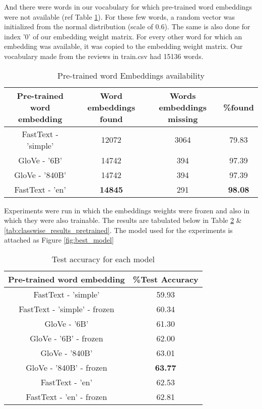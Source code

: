 \documentclass{article}
\begin{document}
\noindent 
And there were words in our vocabulary for which pre-trained word embeddings were not available (ref Table \ref{tab:miss_words}). For these few words, a random vector was initialized from the normal distribution (scale of 0.6). The same is also done for index '0' of our embedding weight matrix. For every other word for which an embedding was available, it was copied to the embedding weight matrix. Our vocabulary made from the reviews in train.csv had 15136 words.\\
\newpage

\begin{table}[h!]
\begin{center}
\begin{tabular}{ |c|c|c|c|} 
 \hline
 Pre-trained word embedding & Word embeddings found & Words embeddings missing  & \%found\\ 
 \hline \hline
 FastText - 'simple' & 12072 & 3064  & 79.83\\ 
 \hline
 GloVe - '6B' & 14742  & 394 & 97.39  \\ 
\hline
 GloVe - '840B' & 14742  & 394  & 97.39\\ 
\hline
 FastText - 'en' & \textbf{14845}  & 291  & \textbf{98.08}\\

\hline
\end{tabular}
\caption{Pre-trained word Embeddings availability }
\label{tab:miss_words}
\end{center}
\end{table}


\noindent 
Experiments were run in which the embeddings weights were frozen and also in which they were also trainable. The results are tabulated below in Table \ref{tab:results_pretrained} \& \ref{tab:classwise_results_pretrained}. The model used for the experiments is attached as Figure \ref{fig:best_model} \\

\begin{table}[h!]
\begin{center}
\begin{tabular}{ |c|c||} 
 \hline
 Pre-trained word embedding & \%Test Accuracy\\ 
 \hline \hline
 FastText - 'simple' & 59.93\\ 
 \hline
 FastText - 'simple' - frozen & 60.34 \\ 
 \hline
 GloVe - '6B' &  61.30 \\ 
\hline
 GloVe - '6B' - frozen &  62.00 \\ 
\hline
 GloVe - '840B' & 63.01 \\
\hline
 GloVe - '840B' - frozen & \textbf{63.77} \\
\hline
 FastText - 'en' & 62.53 \\
 \hline
 FastText - 'en' - frozen & 62.81 \\
\hline
\end{tabular}
\caption{Test accuracy for each model }
\label{tab:results_pretrained}
\end{center}
\end{table}
\end{document}
